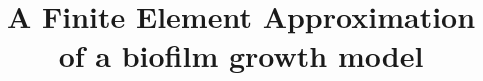 \documentclass[12pt,twoside,table]{book}
\begin{document}
\title{A Finite Element Approximation of a biofilm growth model}


\cleardoublepage



\renewcommand\partname{Part}
\renewcommand\chaptername{Chapter}
\renewcommand\contentsname{Contents}
\renewcommand\listfigurename{List of Figures}
\renewcommand\listtablename{List of Tables}
\renewcommand\indexname{Index}
\renewcommand{\figurename}{Figure}
\renewcommand{\tablename}{Table}
\renewcommand*{\proofname}{Proof}





\pagestyle{empty} %
\frontmatter


\cleardoublepage


\cleardoublepage

\tableofcontents %

\cleardoublepage


\cleardoublepage %

\pagestyle{fancy} %

\begingroup %

\mainmatter %


\setlength\abovedisplayskip{-5pt}
\setlength\belowdisplayskip{\parskip}
\setlength\abovedisplayshortskip{-5pt}
\setlength\belowdisplayshortskip{\parskip}
\end{document}
